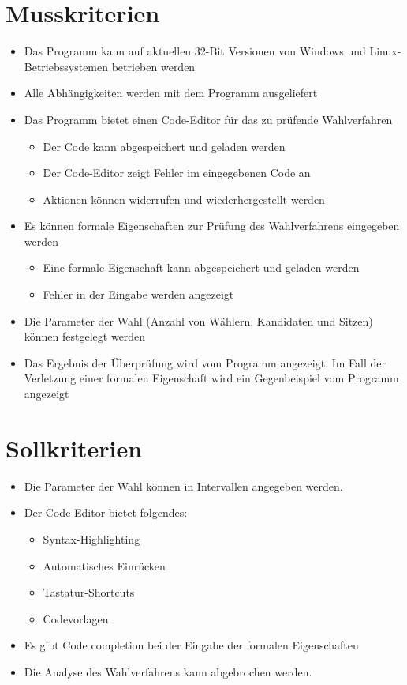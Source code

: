 \documentclass[a4paper]{scrreprt}
\begin{document}
\section{Musskriterien}
\begin{itemize}
\item Das Programm kann auf aktuellen 32-Bit Versionen von Windows und Linux-Betriebssystemen betrieben werden
\item Alle Abhängigkeiten werden mit dem Programm ausgeliefert
\item Das Programm bietet einen Code-Editor für das zu prüfende Wahlverfahren
	\begin{itemize}
	\item Der Code kann abgespeichert und geladen werden
	\item Der Code-Editor zeigt Fehler im eingegebenen Code an
	\item Aktionen können widerrufen und wiederhergestellt werden
	\end{itemize}
\item Es können formale Eigenschaften zur Prüfung des Wahlverfahrens eingegeben werden
	\begin{itemize}
	\item Eine formale Eigenschaft kann abgespeichert und geladen werden	
	\item Fehler in der Eingabe werden angezeigt
	\end{itemize}
\item Die Parameter der Wahl (Anzahl von Wählern, Kandidaten und Sitzen) können festgelegt werden
\item Das Ergebnis der Überprüfung wird vom Programm angezeigt. Im Fall der Verletzung einer formalen Eigenschaft wird ein Gegenbeispiel vom Programm angezeigt
\end{itemize}


\section{Sollkriterien}
\begin{itemize}
\item Die Parameter der Wahl können in Intervallen angegeben werden.
\item Der Code-Editor bietet folgendes:
	\begin{itemize}
	\item Syntax-Highlighting
	\item Automatisches Einrücken
	\item Tastatur-Shortcuts
	\item Codevorlagen
	\end{itemize}
\item Es gibt Code completion bei der Eingabe der formalen Eigenschaften
\item Die Analyse des Wahlverfahrens kann abgebrochen werden.
\end{itemize}
\end{document}
